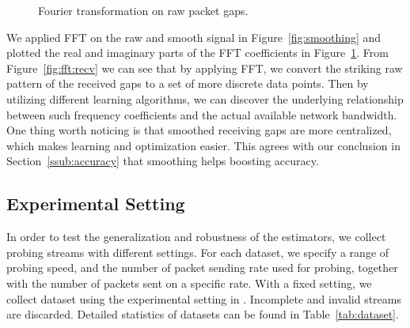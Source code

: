 \begin{figure}[htpb]
   \centering
   \quad
   \caption{Fourier transformation on raw packet gaps.}
   \label{fig:fft}
\end{figure}

We applied FFT on the raw and smooth signal in Figure~\ref{fig:smoothing} and
plotted the real and imaginary parts of the FFT coefficients in
Figure~\ref{fig:fft}. From Figure~\ref{fig:fft:recv} we can see that by
applying FFT, we convert the striking raw pattern of the received gaps to a set
of more discrete data points. Then by utilizing different learning algorithms,
we can discover the underlying relationship between such frequency coefficients
and the actual available network bandwidth. One thing worth noticing is that
smoothed receiving gaps are more centralized, which makes learning and
optimization easier. This agrees with our conclusion in
Section~\ref{ssub:accuracy} that smoothing helps boosting accuracy.

\subsection{Experimental Setting}
\label{sub:parameter_setting}
In order to test the generalization and robustness of the estimators, we
collect probing streams with different settings.
For each dataset, we specify a range of probing speed, and the number of packet
sending rate used for probing, together with the number of packets sent on a
specific rate. With a fixed setting, we collect dataset using the experimental
setting in \cite{Yin2014}. Incomplete and invalid streams are discarded.
Detailed statistics of datasets can be found in Table~\ref{tab:dataset}.

